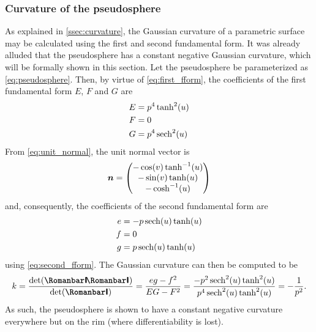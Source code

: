 \subsubsection{Curvature of the pseudosphere}
As explained in \cref{ssec:curvature}, the Gaussian curvature of a parametric surface may be calculated using the first and second fundamental form. It was already alluded that the pseudosphere has a constant negative Gaussian curvature, which will be formally shown in this section. 
Let the pseudosphere be parameterized as \cref{eq:pseudosphere}. Then, by virtue of \cref{eq:first_fform}, the coefficients of the first fundamental form \(E\), \(F\) and \(G\) are
\[
    \begin{split}
        E & = p^4\tanh[2](u) \\
        F & = 0 \\
        G & = p^4\sech[2](u) \\
    \end{split}
\]
From \cref{eq:unit_normal}, the unit normal vector is
\[
    \vec{n} 
    = \mqty(
        -\cos(v)\tanh[-1](u) \\
        -\sin(v)\tanh(u)\\
        -\cosh[-1](u)\\
    )
\]
and, consequently, the coefficients of the second fundamental form are
\begin{equation*}
    \begin{split}
        e &= -p\sech(u)\tanh(u)\\
        f &= 0\\
        g &= p\sech(u)\tanh(u)\\
    \end{split}
\end{equation*}
using \cref{eq:second_fform}. 
The Gaussian curvature can then be computed to be \cite{ONeill2006}
\begin{equation}
    k = \frac{\det(\secondff)}{\det(\firstff)} = \frac{eg - f^2}{EG - F^2} 
    = \frac{-p^2\sech[2](u)\tanh[2](u)}{p^4\sech[2](u)\tanh[2](u)} = -\frac{1}{p^2}.
\end{equation}
As such, the pseudosphere is shown to have a constant negative curvature everywhere but on the rim (where differentiability is lost).

